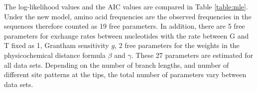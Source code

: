 \noindent The log-likelihood values and the AIC values are compared in Table \ref{table:mle}.\\

\noindent Under the new model, amino acid frequencies are the observed frequencies in the sequences therefore counted as 19 free parameters.
In addition, there are 5 free parameters for exchange rates between nucleotides with the rate between G and T fixed as 1, Grantham sensitivity $g$, 2 free parameters for the weights in the physicochemical distance formula $\beta$ and $\gamma$. 
These 27 parameters are estimated for all data sets. Depending on the number of branch lengths, and number of different site patterns at the tips, the total number of parameters vary between data sets.\\

